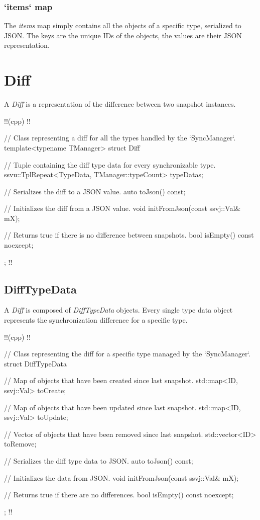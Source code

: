 \documentclass{report}
\begin{document}
                \subsubsection{`items` map}

                    The \emph{items} map simply contains all the objects of a specific type, serialized to JSON.
                    The keys are the unique IDs of the objects, the values are their JSON representation.
            
        \section{Diff}

            A \emph{Diff} is a representation of the difference between two snapshot instances.

!!(cpp)
!!{
    // Class representing a diff for all the types handled by the `SyncManager`.
    template<typename TManager> struct Diff
    {
        // Tuple containing the diff type data for every synchronizable type.
        ssvu::TplRepeat<TypeData, TManager::typeCount> typeDatas;

        // Serializes the diff to a JSON value.
        auto toJson() const;

        // Initializes the diff from a JSON value.
        void initFromJson(const ssvj::Val& mX);

        // Returns true if there is no difference between snapshots.
        bool isEmpty() const noexcept;
    };
!!}

            \subsection{DiffTypeData}

                A \emph{Diff} is composed of \emph{DiffTypeData} objects. 
                Every single type data object represents the synchronization difference for a specific type.

!!(cpp)
!!{
    // Class representing the diff for a specific type managed by the `SyncManager`.
    struct DiffTypeData
    {
        // Map of objects that have been created since last snapshot.
        std::map<ID, ssvj::Val> toCreate;

        // Map of objects that have been updated since last snapshot.
        std::map<ID, ssvj::Val> toUpdate;
        
        // Vector of objects that have been removed since last snapshot.
        std::vector<ID> toRemove;

        // Serializes the diff type data to JSON.
        auto toJson() const;

        // Initializes the data from JSON.
        void initFromJson(const ssvj::Val& mX);

        // Returns true if there are no differences.
        bool isEmpty() const noexcept;
    };
!!}
\end{document}
